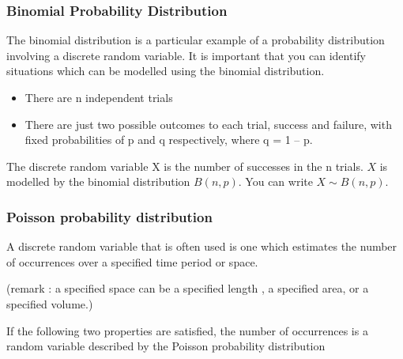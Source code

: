 \documentclass[IntroMain.tex]{subfiles}
\begin{document}
\begin{frame}
	\frametitle{Binomial Probability Distribution}
The binomial distribution is a particular example of a probability distribution involving a discrete random variable. 
It is important that you can identify situations which can be modelled using the binomial distribution. 
\begin{itemize}
\item There are n independent trials 
\item There are just two possible outcomes to each trial, success and failure, with fixed probabilities of p and q respectively, where q = 1 – p. 
\end{itemize}

The discrete random variable X is the number of successes in the n trials. 
$X$ is modelled by the binomial distribution $B(n,p)$. You can write $X \sim B(n, p)$.
\end{frame}
\begin{frame}
	\frametitle{Poisson probability distribution}

A discrete random variable that is often used is one which estimates the number of occurrences  over a specified time period or space.

(remark : a specified space can be a specified length , a specified area, or a specified volume.)

If the following two properties are satisfied, the number of occurrences is a random variable described by the Poisson probability distribution

\end{frame}
\end{document}
